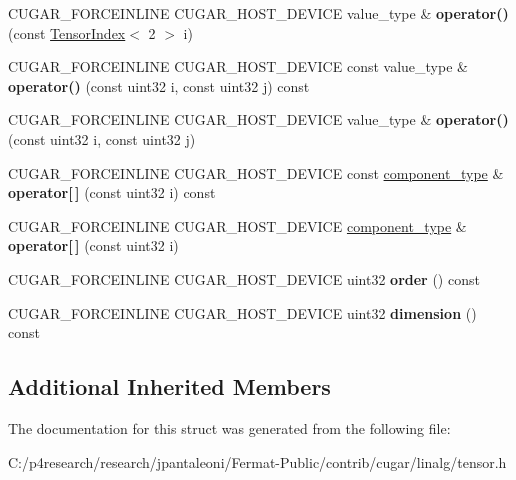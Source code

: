 \begin{DoxyCompactItemize}
C\+U\+G\+A\+R\+\_\+\+F\+O\+R\+C\+E\+I\+N\+L\+I\+NE C\+U\+G\+A\+R\+\_\+\+H\+O\+S\+T\+\_\+\+D\+E\+V\+I\+CE value\+\_\+type \& {\bfseries operator()} (const \hyperlink{structcugar_1_1_tensor_index}{Tensor\+Index}$<$ 2 $>$ i)
\item 
\mbox{\label{structcugar_1_1_tensor_3_01_t_00_012_00_01_n_01_4_a1ea60a0e7c359ea7f89c1da086ac6ae6}} 
C\+U\+G\+A\+R\+\_\+\+F\+O\+R\+C\+E\+I\+N\+L\+I\+NE C\+U\+G\+A\+R\+\_\+\+H\+O\+S\+T\+\_\+\+D\+E\+V\+I\+CE const value\+\_\+type \& {\bfseries operator()} (const uint32 i, const uint32 j) const
\item 
\mbox{\label{structcugar_1_1_tensor_3_01_t_00_012_00_01_n_01_4_ad8d92ce07dfb44da40b89366326620bd}} 
C\+U\+G\+A\+R\+\_\+\+F\+O\+R\+C\+E\+I\+N\+L\+I\+NE C\+U\+G\+A\+R\+\_\+\+H\+O\+S\+T\+\_\+\+D\+E\+V\+I\+CE value\+\_\+type \& {\bfseries operator()} (const uint32 i, const uint32 j)
\item 
\mbox{\label{structcugar_1_1_tensor_3_01_t_00_012_00_01_n_01_4_a65c1c65cb86dae6e1e26b9aa0d9fda92}} 
C\+U\+G\+A\+R\+\_\+\+F\+O\+R\+C\+E\+I\+N\+L\+I\+NE C\+U\+G\+A\+R\+\_\+\+H\+O\+S\+T\+\_\+\+D\+E\+V\+I\+CE const \hyperlink{structcugar_1_1_tensor_3_01_t_00_011_00_01_n_01_4}{component\+\_\+type} \& {\bfseries operator\mbox{[}$\,$\mbox{]}} (const uint32 i) const
\item 
\mbox{\label{structcugar_1_1_tensor_3_01_t_00_012_00_01_n_01_4_a636b4e8b7c1ddfc4805382297dce30a8}} 
C\+U\+G\+A\+R\+\_\+\+F\+O\+R\+C\+E\+I\+N\+L\+I\+NE C\+U\+G\+A\+R\+\_\+\+H\+O\+S\+T\+\_\+\+D\+E\+V\+I\+CE \hyperlink{structcugar_1_1_tensor_3_01_t_00_011_00_01_n_01_4}{component\+\_\+type} \& {\bfseries operator\mbox{[}$\,$\mbox{]}} (const uint32 i)
\item 
\mbox{\label{structcugar_1_1_tensor_3_01_t_00_012_00_01_n_01_4_a6b281939315074fe4251d04388aed2a7}} 
C\+U\+G\+A\+R\+\_\+\+F\+O\+R\+C\+E\+I\+N\+L\+I\+NE C\+U\+G\+A\+R\+\_\+\+H\+O\+S\+T\+\_\+\+D\+E\+V\+I\+CE uint32 {\bfseries order} () const
\item 
\mbox{\label{structcugar_1_1_tensor_3_01_t_00_012_00_01_n_01_4_a44457117748b12a95ff8ef61e15f0005}} 
C\+U\+G\+A\+R\+\_\+\+F\+O\+R\+C\+E\+I\+N\+L\+I\+NE C\+U\+G\+A\+R\+\_\+\+H\+O\+S\+T\+\_\+\+D\+E\+V\+I\+CE uint32 {\bfseries dimension} () const
\end{DoxyCompactItemize}
\subsection*{Additional Inherited Members}


The documentation for this struct was generated from the following file\+:\begin{DoxyCompactItemize}
\item 
C\+:/p4research/research/jpantaleoni/\+Fermat-\/\+Public/contrib/cugar/linalg/tensor.\+h\end{DoxyCompactItemize}
